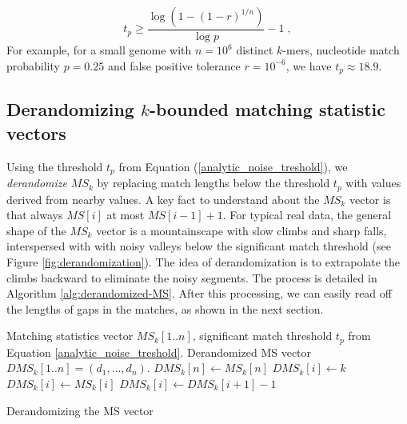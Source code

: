 \documentclass[unnumsec,webpdf,contemporary,large]{oup-authoring-template}%
\theoremstyle{thmstyleone}%
\theoremstyle{thmstyletwo}%
\theoremstyle{thmstylethree}%
\begin{document}
\begin{equation}\label{analytic_noise_treshold}
t_p \geq \frac{\log (1 - (1-r)^{1/n})}{\log p} - 1\;,
\end{equation}
For example, for a small genome with $n = 10^6$ distinct $k$-mers,  nucleotide match probability $p = 0.25$ and false positive tolerance $r = 10^{-6}$, we have $t_p \approx 18.9$.

\subsection{\texorpdfstring{Derandomizing $k$-bounded matching statistic vectors}{Derandomizing k-bounded matching statistic vectors}}

Using the threshold $t_p$ from Equation (\ref{analytic_noise_treshold}), we \emph{derandomize} $MS_k$ by replacing match lengths below the threshold $t_p$ with values derived from nearby values. A key fact to understand about the $MS_k$ vector is that always $MS[i]$ at most $MS[i-1]+1$. For typical real data, the general shape of the $MS_k$ vector is a mountainscape with slow climbs and sharp falls, interspersed with with noisy valleys below the significant match threshold (see Figure \ref{fig:derandomization}). The idea of derandomization is to extrapolate the climbs backward to eliminate the noisy segments. The process is detailed in Algorithm \ref{alg:derandomized-MS}. After this processing, we can easily read off the lengths of gaps in the matches, as shown in the next section.

\begin{algorithm}
\begin{algorithmic}[1]
\small
\Require Matching statistics vector $MS_k[1..n]$, significant match threshold $t_p$ from Equation \ref{analytic_noise_treshold}.
\Ensure Derandomized MS vector $DMS_k[1..n] = (d_1, \ldots, d_{n})$.
\State $DMS_k[n] \gets MS_k[n]$
\State $DMS_k[i] \gets k$
    \State $DMS_k[i] \gets MS_k[i]$
\Else
    \State $DMS_k[i] \gets DMS_k[i+1]-1$
\EndIf
\EndFor
\caption{\small Derandomizing the MS vector} 
\label{alg:derandomized-MS}
\end{algorithmic}
\end{algorithm}
\end{document}
